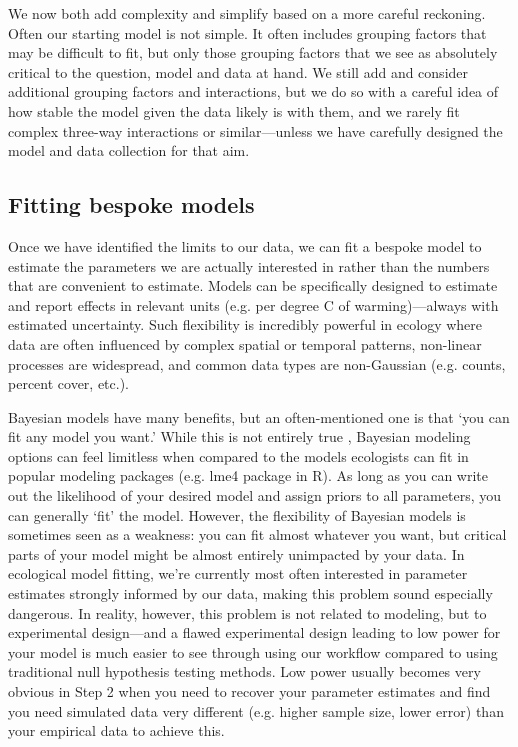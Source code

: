 \documentclass[11pt]{article}
\begin{document}
We now both add complexity and simplify based on a more careful reckoning. Often our starting model is not simple.  It often includes grouping factors that may be difficult to fit, but only those grouping factors that we see as absolutely critical to the question, model and data at hand. We still add and consider additional grouping factors and interactions, but we do so with a careful idea of how stable the model given the data likely is with them, and we rarely fit complex three-way interactions or similar---unless we have carefully designed the model and data collection for that aim. 

 \subsection*{Fitting bespoke models} 
Once we have identified the limits to our data, we can fit a bespoke model to estimate the parameters we are actually interested in rather than the numbers that are convenient to estimate. Models can be specifically designed to estimate and report effects in relevant units (e.g. per degree C of warming)---always with estimated uncertainty. Such flexibility is incredibly powerful in ecology where data are often influenced by complex spatial or temporal patterns, non-linear processes are widespread, and common data types are non-Gaussian (e.g. counts, percent cover, etc.). 

Bayesian models have many benefits, but an often-mentioned one is that `you can fit any model you want.' While this is not entirely true \citep{BDA,reid2019}, Bayesian modeling options can feel limitless when compared to the models ecologists can fit in popular modeling packages (e.g. \textsf{lme4} package in \textsf{R}). As long as you can write out the likelihood of your desired model \citep[and sometimes even if you can't,][]{Sunnaaker2013} and assign priors to all parameters, you can generally `fit' the model. However, the flexibility of Bayesian models is sometimes seen as a weakness: you can fit almost whatever you want, but critical parts of your model might be almost entirely unimpacted by your data. In ecological model fitting, we're currently most often interested in parameter estimates strongly informed by our data, making this problem sound especially dangerous. In reality, however, this problem is not related to modeling, but to experimental design---and a flawed experimental design leading to low power for your model is much easier to see through using our workflow compared to using traditional null hypothesis testing methods. Low power usually becomes very obvious in Step 2 when you need to recover your parameter estimates and find you need simulated data very different (e.g. higher sample size, lower error) than your empirical data to achieve this.
\end{document}
